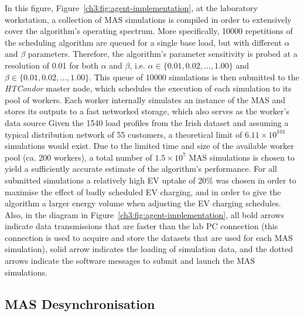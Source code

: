 In this figure, Figure~\ref{ch3:fig:agent-implementation}, at the laboratory workstation, a collection of MAS simulations is compiled in order to extensively cover the algorithm's operating spectrum.
More specifically, 10000 repetitions of the scheduling algorithm are queued for a single base load, but with different $\alpha$ and $\beta$ parameters.
Therefore, the algorithm's parameter sensitivity is probed at a resolution of 0.01 for both $\alpha$ and $\beta$, i.e. $\alpha \in \{0.01, 0.02, \dots, 1.00\}$ and $\beta \in \{0.01, 0.02, \dots, 1.00\}$.
This queue of 10000 simulations is then submitted to the \textit{HTCondor} master node, which schedules the execution of each simulation to its pool of workers.
Each worker internally simulates an instance of the MAS and stores its outputs to a fast networked storage, which also serves as the worker's data source
Given the 1540 load profiles from the Irish dataset and assuming a typical distribution network of 55 customers, a theoretical limit of $6.11\times10^{101}$ simulations would exist.
Due to the limited time and size of the available worker pool (ca. 200 workers), a total number of $1.5\times10^{7}$ MAS simulations is chosen to yield a sufficiently accurate estimate of the algorithm's performance.
For all submitted simulations a relatively high EV uptake of 20\% was chosen in order to maximise the effect of badly scheduled EV charging, and in order to give the algorithm a larger energy volume when adjusting the EV charging schedules.
Also, in the diagram in Figure~\ref{ch3:fig:agent-implementation}, all bold arrows indicate data transmissions that are faster than the lab PC connection (this connection is used to acquire and store the datasets that are used for each MAS simulation), solid arrow indicates the loading of simulation data, and the dotted arrows indicate the software messages to submit and launch the MAS simulations.

\subsection{MAS Desynchronisation}
\label{ch3:subsec:desynchronisation}

